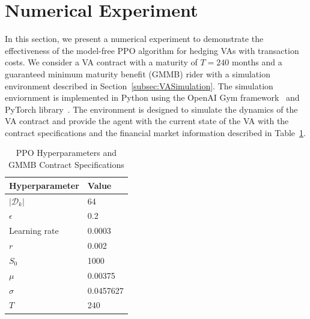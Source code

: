 \section{Numerical Experiment}

In this section, we present a numerical experiment to demonstrate the effectiveness of the model-free PPO algorithm for hedging VAs with transaction costs.
We consider a VA contract with a maturity of $T=240$ months and a guaranteed minimum maturity benefit (GMMB) rider with a simulation environment described in Section~\ref{subsec:VASimulation}.
The simulation enviornment is implemented in Python using the OpenAI Gym framework~\citep{brockman2016openai} and PyTorch library~\citep{paszke2019pytorch}.
The environment is designed to simulate the dynamics of the VA contract and provide the agent with the current state of the VA with the contract specifications and the financial market information described in Table~\ref{tab3:hyperparameters}.

\begin{table}[ht!]
    \centering
    \begin{tabular}{ll} 
        \toprule
        Hyperparameter & Value \\
        \midrule
        $|\mathcal{D}_k|$   & 64        \\
        $\epsilon$          & 0.2       \\
        Learning rate       & 0.0003    \\
        $r$                 & 0.002     \\
        $S_0$               & 1000      \\
        $\mu$               & 0.00375   \\
        $\sigma$            & 0.0457627 \\
        $T$                 & 240       \\
        \bottomrule
    \end{tabular}
    \caption{PPO Hyperparameters and GMMB Contract Specifications} 
    \label{tab3:hyperparameters}
\end{table}

